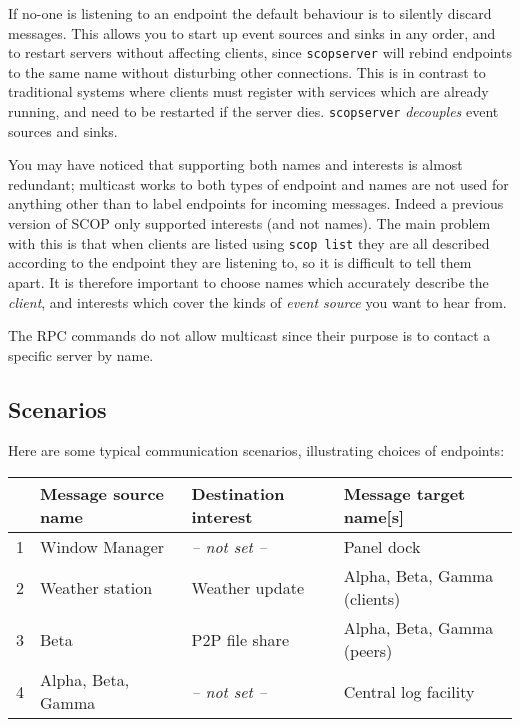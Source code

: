 \documentclass[12pt,a4paper,twoside]{article}
\renewcommand{\_}{\texttt{\symbol{95}}}
\begin{document}
If no-one is listening to an endpoint the default behaviour is to
silently discard messages. This allows you to start up event sources
and sinks in any order, and to restart servers without affecting
clients, since \texttt{scopserver} will rebind endpoints to the same
name without disturbing other connections. This is in contrast
to traditional systems where clients must register with services
which are already running, and need to be restarted if the server
dies. \texttt{scopserver} \textit{decouples} event sources and sinks.

You may have noticed that supporting both names and interests is almost
redundant; multicast works to both types of endpoint and names are not
used for anything other than to label endpoints for incoming messages.
Indeed a previous version of SCOP only supported interests (and not
names). The main problem with this is that when clients are listed
using \texttt{scop list} they are all described according to the
endpoint they are listening to, so it is difficult to tell them apart.
It is therefore important to choose names which accurately describe the
\textit{client}, and interests which cover the kinds of
\textit{event source} you want to hear from.

The RPC commands do not allow multicast since their purpose is
to contact a specific server by name.

\subsection{Scenarios}

Here are some typical communication scenarios, illustrating
choices of endpoints:

\begin{center}
\begin{tabular}{|l|l|l|l|}
\hline
& \rule[-3mm]{0mm}{8mm}Message source name &
Destination interest & Message target name[s]\\
\hline
1 & \rule{0mm}{5mm}Window Manager & \textit{-- not set --} & Panel dock\\
2 & Weather station & Weather update & Alpha, Beta, Gamma (clients)\\
3 & Beta & P2P file share & Alpha, Beta, Gamma (peers)\\
4 & Alpha, Beta, Gamma & \textit{-- not set --} & Central log facility\\
\hline
\end{tabular}
\end{center}
\end{document}
